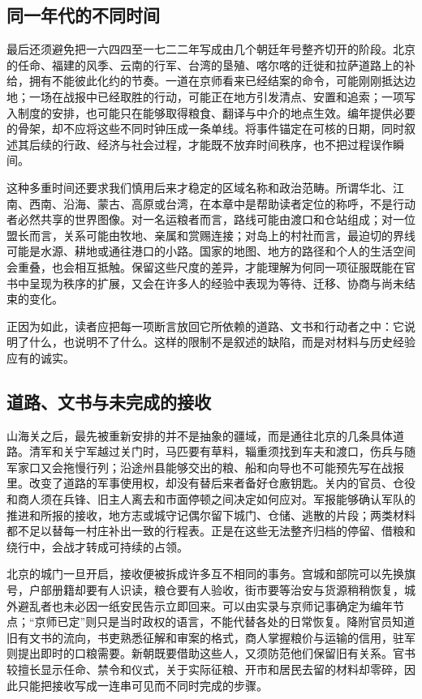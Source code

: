 \subsection*{同一年代的不同时间}
最后还须避免把一六四四至一七二二年写成由几个朝廷年号整齐切开的阶段。北京的任命、福建的风季、云南的行军、台湾的垦殖、喀尔喀的迁徙和拉萨道路上的补给，拥有不能彼此化约的节奏。一道在京师看来已经结案的命令，可能刚刚抵达边地；一场在战报中已经取胜的行动，可能正在地方引发清点、安置和追索；一项写入制度的安排，也可能只在能够取得粮食、翻译与中介的地点生效。编年提供必要的骨架，却不应将这些不同时钟压成一条单线。将事件锚定在可核的日期，同时叙述其后续的行政、经济与社会过程，才能既不放弃时间秩序，也不把过程误作瞬间。

这种多重时间还要求我们慎用后来才稳定的区域名称和政治范畴。所谓华北、江南、西南、沿海、蒙古、高原或台湾，在本章中是帮助读者定位的称呼，不是行动者必然共享的世界图像。对一名运粮者而言，路线可能由渡口和仓站组成；对一位盟长而言，关系可能由牧地、亲属和赏赐连接；对岛上的村社而言，最迫切的界线可能是水源、耕地或通往港口的小路。国家的地图、地方的路径和个人的生活空间会重叠，也会相互抵触。保留这些尺度的差异，才能理解为何同一项征服既能在官书中呈现为秩序的扩展，又会在许多人的经验中表现为等待、迁移、协商与尚未结束的变化。

正因为如此，读者应把每一项断言放回它所依赖的道路、文书和行动者之中：它说明了什么，也说明不了什么。这样的限制不是叙述的缺陷，而是对材料与历史经验应有的诚实。

\subsection*{道路、文书与未完成的接收}

山海关之后，最先被重新安排的并不是抽象的疆域，而是通往北京的几条具体道路。清军和关宁军越过关门时，马匹要有草料，辎重须找到车夫和渡口，伤兵与随军家口又会拖慢行列；沿途州县能够交出的粮、船和向导也不可能预先写在战报里。改变了道路的军事使用权，却没有替后来者备好仓廒钥匙。关内的官员、仓役和商人须在兵锋、旧主人离去和市面停顿之间决定如何应对。军报能够确认军队的推进和所报的接收，地方志或城守记偶尔留下城门、仓储、逃散的片段；两类材料都不足以替每一村庄补出一致的行程表。正是在这些无法整齐归档的停留、借粮和绕行中，会战才转成可持续的占领。

北京的城门一旦开启，接收便被拆成许多互不相同的事务。宫城和部院可以先换旗号，户部册籍却要有人识读，粮仓要有人验收，街市要等治安与货源稍稍恢复，城外避乱者也未必因一纸安民告示立即回来。可以由实录与京师记事确定为编年节点；“京师已定”则只是当时政权的语言，不能代替各处的日常恢复。降附官员知道旧有文书的流向，书吏熟悉征解和审案的格式，商人掌握粮价与运输的信用，驻军则提出即时的口粮需要。新朝既要借助这些人，又须防范他们保留旧有关系。官书较擅长显示任命、禁令和仪式，关于实际征粮、开市和居民去留的材料却零碎，因此只能把接收写成一连串可见而不同时完成的步骤。

